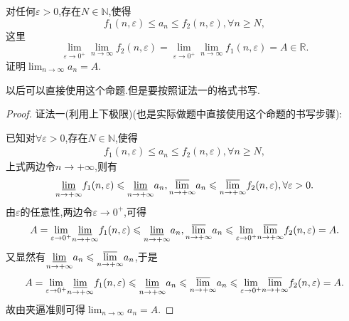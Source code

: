 \documentclass[../../main.tex]{subfiles}%
\begin{document}
\begin{proposition}
对任何\(\varepsilon > 0\),存在\(N \in \mathbb{N}\),使得
\[
f_1(n,\varepsilon) \leqslant  a_n \leqslant  f_2(n,\varepsilon), \forall n \geqslant  N,
\]
这里
\[
\lim_{\varepsilon \to 0^+} \lim_{n \to \infty} f_2(n,\varepsilon) = \lim_{\varepsilon \to 0^+} \lim_{n \to \infty} f_1(n,\varepsilon) = A \in \mathbb{R}.
\]
证明\(\lim_{n \to \infty} a_n = A\).
\end{proposition}
\begin{note}
以后可以直接使用这个命题.但是要按照证法一的格式书写.
\end{note}
\begin{proof}

{\color{blue}证法一(利用上下极限)(也是实际做题中直接使用这个命题的书写步骤):}

已知对$\forall \varepsilon>0$,存在$N\in \mathbb{N}$,使得
\begin{align*}
f_1(n,\varepsilon) \leqslant  a_n \leqslant  f_2(n,\varepsilon), \forall n \geqslant  N,
\end{align*}
上式两边令$n\to+\infty$,则有
\begin{align*}
\underset{n\rightarrow +\infty}{{\varliminf }}f_1(n,\varepsilon )\leqslant \underset{n\rightarrow +\infty}{{\varliminf }}a_n,\underset{n\rightarrow +\infty}{{\varlimsup }}a_n\leqslant \underset{n\rightarrow +\infty}{{\varlimsup }}f_2(n,\varepsilon ),\forall \varepsilon >0.
\end{align*}
由$\varepsilon$的任意性,两边令$\varepsilon\to 0^+$,可得
\begin{align*}
A=\underset{\varepsilon \rightarrow 0^+}{\lim}\underset{n\rightarrow +\infty}{{\varliminf }}f_1(n,\varepsilon )\leqslant \underset{n\rightarrow +\infty}{{\varliminf }}a_n,\underset{n\rightarrow +\infty}{{\varlimsup }}a_n\leqslant \underset{\varepsilon \rightarrow 0^+}{\lim}\underset{n\rightarrow +\infty}{{\varlimsup }}f_2(n,\varepsilon )=A.
\end{align*}
又显然有$\underset{n\rightarrow +\infty}{{\varliminf }}a_n\leqslant \underset{n\rightarrow +\infty}{{\varlimsup }}a_n$,于是
\begin{align*}
A=\underset{\varepsilon \rightarrow 0^+}{\lim}\underset{n\rightarrow +\infty}{{\varliminf }}f_1(n,\varepsilon )\leqslant \underset{n\rightarrow +\infty}{{\varliminf }}a_n\leqslant \underset{n\rightarrow +\infty}{{\varlimsup }}a_n\leqslant \underset{\varepsilon \rightarrow 0^+}{\lim}\underset{n\rightarrow +\infty}{{\varlimsup }}f_2(n,\varepsilon )=A.
\end{align*}
故由夹逼准则可得$\lim_{n \to \infty} a_n = A$.


\end{proof}
\end{document}
